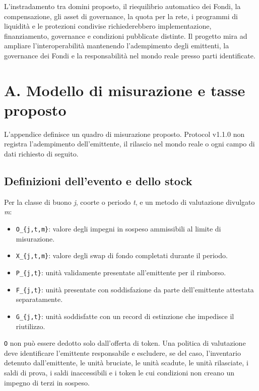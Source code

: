 \documentclass[11pt]{article}
\begin{document}
L'instradamento tra domini proposto, il riequilibrio automatico dei Fondi, la compensazione, gli asset di governance, la quota per la rete, i programmi di liquidità e le protezioni condivise richiederebbero implementazione, finanziamento, governance e condizioni pubblicate distinte. Il progetto mira ad ampliare l'interoperabilità mantenendo l'adempimento degli emittenti, la governance dei Fondi e la responsabilità nel mondo reale presso parti identificate.


\section*{A. Modello di misurazione e tasse proposto}

L'appendice definisce un quadro di misurazione proposto. Protocol v1.1.0 non registra l'adempimento dell'emittente, il rilascio nel mondo reale o ogni campo di dati richiesto di seguito.

\subsection*{Definizioni dell'evento e dello stock}

Per la classe di buono \emph{j}, coorte o periodo \emph{t}, e un metodo di valutazione divulgato \emph{m}:

\begin{itemize}[leftmargin=*]
\item \texttt{O\_\{j,t,m\}}: valore degli impegni in sospeso ammissibili al limite di misurazione.
\item \texttt{X\_\{j,t,m\}}: valore degli swap di fondo completati durante il periodo.
\item \texttt{P\_\{j,t\}}: unità validamente presentate all'emittente per il rimborso.
\item \texttt{F\_\{j,t\}}: unità presentate con soddisfazione da parte dell'emittente attestata separatamente.
\item \texttt{G\_\{j,t\}}: unità soddisfatte con un record di estinzione che impedisce il riutilizzo.
\end{itemize}
\texttt{O} non può essere dedotto solo dall'offerta di token. Una politica di valutazione deve identificare l'emittente responsabile e escludere, se del caso, l'inventario detenuto dall'emittente, le unità bruciate, le unità scadute, le unità rilasciate, i saldi di prova, i saldi inaccessibili e i token le cui condizioni non creano un impegno di terzi in sospeso.
\end{document}
